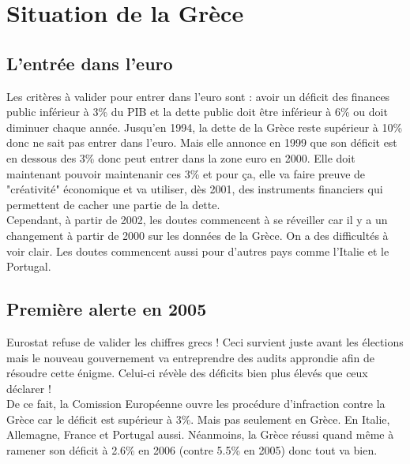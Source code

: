 \section{Situation de la Grèce}
\subsection{L'entrée dans l'euro}
Les critères à valider pour entrer dans l'euro sont : avoir un déficit des finances public inférieur à 3\% du PIB et la dette public doit être inférieur à 6\% ou doit diminuer chaque année. Jusqu'en 1994, la dette de la Grèce reste supérieur à 10\% donc ne sait pas entrer dans l'euro. Mais elle annonce en 1999 que son déficit est en dessous des 3\% donc peut entrer dans la zone euro en 2000. Elle doit maintenant pouvoir maintenanir ces 3\% et pour ça, elle va faire preuve de "créativité" économique et va utiliser, dès 2001, des instruments financiers qui permettent de cacher une partie de la dette. \\
Cependant, à partir de 2002, les doutes commencent à se réveiller car il y a un changement à partir de 2000 sur les données de la Grèce. On a des difficultés à voir clair. Les doutes commencent aussi pour d'autres pays comme l'Italie et le Portugal. 

\subsection{Première alerte en 2005}
Eurostat refuse de valider les chiffres grecs ! Ceci survient juste avant les élections mais le nouveau gouvernement va entreprendre des audits approndie afin de résoudre cette énigme. Celui-ci révèle des déficits bien plus élevés que ceux déclarer !\\
De ce fait, la Comission Européenne ouvre les procédure d'infraction contre la Grèce car le déficit est supérieur à 3\%. Mais pas seulement en Grèce. En Italie, Allemagne, France et Portugal aussi. Néanmoins, la Grèce réussi quand même à ramener son déficit à 2.6\% en 2006 (contre 5.5\% en 2005) donc tout va bien.


